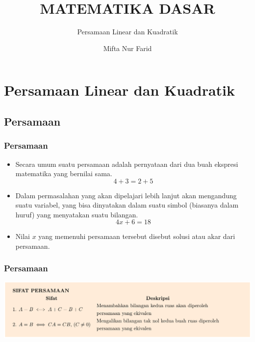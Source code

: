 \documentclass[pdflatex,compress,mathserif]{beamer}
\title{MATEMATIKA DASAR}
\subtitle{Persamaan Linear dan Kuadratik}
\author{Mifta Nur Farid}
\begin{document}
\maketitle

\section{Persamaan Linear dan Kuadratik}

\subsection{Persamaan}

\begin{frame}
\frametitle{Persamaan}
	\begin{itemize}
		\item Secara umum suatu persamaan adalah pernyataan dari dua buah ekspresi matematika yang bernilai sama.
		$$ 4 + 3 = 2 + 5 $$
		\item Dalam permasalahan yang akan dipelajari lebih lanjut akan mengandung suatu variabel, yang bisa dinyatakan dalam suatu simbol (biasanya dalam huruf) yang menyatakan suatu bilangan.
		$$ 4x+6 = 18 $$
		\item Nilai $x$ yang memenuhi persamaan tersebut disebut solusi atau akar dari persamaan.
	\end{itemize}
\end{frame}

\begin{frame}
	\frametitle{Persamaan}
	\begin{center}
		\includegraphics[width=\linewidth]{img/img01}
	\end{center}
\end{frame}
\end{document}
